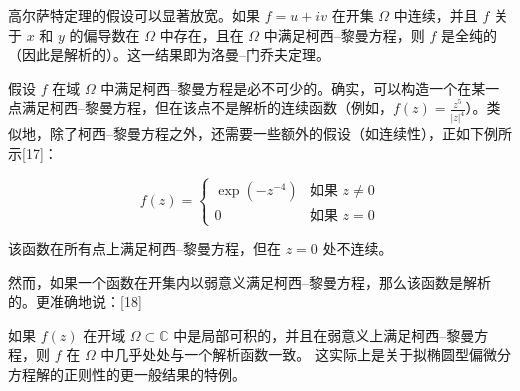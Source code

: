 高尔萨特定理的假设可以显著放宽。如果 \( f = u + iv \) 在开集 \( \Omega \) 中连续，并且 \( f \) 关于 \( x \) 和 \( y \) 的偏导数在 \( \Omega \) 中存在，且在 \( \Omega \) 中满足柯西–黎曼方程，则 \( f \) 是全纯的（因此是解析的）。这一结果即为洛曼–门乔夫定理。

假设 \( f \) 在域 \( \Omega \) 中满足柯西–黎曼方程是必不可少的。确实，可以构造一个在某一点满足柯西–黎曼方程，但在该点不是解析的连续函数（例如，\( f(z) = \frac{z^5}{|z|^4} \)）。类似地，除了柯西–黎曼方程之外，还需要一些额外的假设（如连续性），正如下例所示[17]：

\[
f(z) = 
\begin{cases} 
\exp(-z^{-4}) & \text{如果 } z \neq 0 \\
0 & \text{如果 } z = 0
\end{cases}
\]

该函数在所有点上满足柯西–黎曼方程，但在 \( z = 0 \) 处不连续。

然而，如果一个函数在开集内以弱意义满足柯西–黎曼方程，那么该函数是解析的。更准确地说：[18]

如果 \( f(z) \) 在开域 \( \Omega \subset \mathbb{C} \) 中是局部可积的，并且在弱意义上满足柯西–黎曼方程，则 \( f \) 在 \( \Omega \) 中几乎处处与一个解析函数一致。  
这实际上是关于拟椭圆型偏微分方程解的正则性的更一般结果的特例。